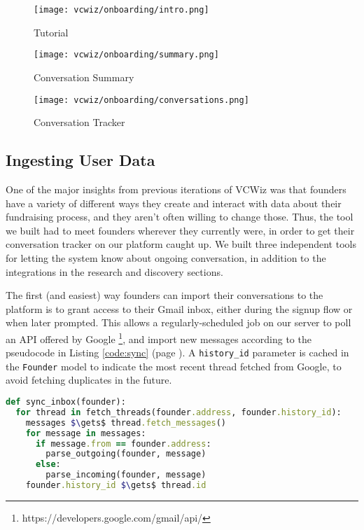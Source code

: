 \begin{figure}[ht]
  \centering
  \begin{minipage}{0.33\textwidth}
    \centering
    \texttt{[image: vcwiz/onboarding/intro.png]}
    \caption*{Tutorial}
  \end{minipage}\hfill
  \begin{minipage}{0.33\textwidth}
    \centering
    \texttt{[image: vcwiz/onboarding/summary.png]}
    \caption*{Conversation Summary}
  \end{minipage}\hfill
  \begin{minipage}{0.33\textwidth}
    \centering
    \texttt{[image: vcwiz/onboarding/conversations.png]}
    \caption*{Conversation Tracker}
  \end{minipage}
\end{figure}

\subsection{Ingesting User Data}

One of the major insights from previous iterations of VCWiz was that founders have a variety of different ways they create and interact with data about their fundraising process, and they aren't often willing to change those. Thus, the tool we built had to meet founders wherever they currently were, in order to get their conversation tracker on our platform caught up. We built three independent tools for letting the system know about ongoing conversation, in addition to the integrations in the research and discovery sections.

The first (and easiest) way founders can import their conversations to the platform is to grant access to their Gmail inbox, either during the signup flow or when later prompted. This allows a regularly-scheduled job on our server to poll an API offered by Google \footnote{https://developers.google.com/gmail/api/}, and import new messages according to the pseudocode in Listing \ref{code:sync} (page \pageref{code:sync}). A \texttt{history\_id} parameter is cached in the \texttt{Founder} model to indicate the most recent thread fetched from Google, to avoid fetching duplicates in the future.

\begin{lstlisting}[float,frame=single,mathescape=true,language=Ruby,basicstyle=\footnotesize,columns=fullflexible,caption={Sync Inbox},label={code:sync}]
def sync_inbox(founder):
  for thread in fetch_threads(founder.address, founder.history_id):
    messages $\gets$ thread.fetch_messages()
    for message in messages:
      if message.from == founder.address:
        parse_outgoing(founder, message)
      else:
        parse_incoming(founder, message)
    founder.history_id $\gets$ thread.id
\end{lstlisting}

